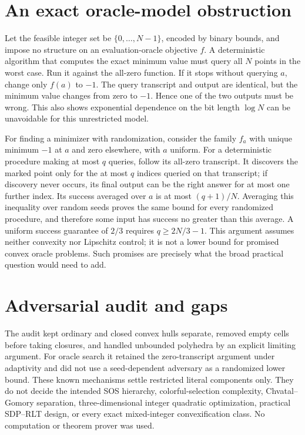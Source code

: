 \documentclass[11pt]{article}
\begin{document}
\section{An exact oracle-model obstruction}
Let the feasible integer set be $\{0,\ldots,N-1\}$, encoded by binary bounds,
and impose no structure on an evaluation-oracle objective $f$.
A deterministic algorithm that computes the exact minimum value must query
all $N$ points in the worst case. Run it against the all-zero function.
If it stops without querying $a$, change only $f(a)$ to $-1$.
The query transcript and output are identical, but the minimum value changes
from zero to $-1$. Hence one of the two outputs must be wrong.
This also shows exponential dependence on the bit length $\log N$ can be
unavoidable for this unrestricted model.

For finding a minimizer with randomization, consider the family $f_a$ with
unique minimum $-1$ at $a$ and zero elsewhere, with $a$ uniform.
For a deterministic procedure making at most $q$ queries, follow its all-zero
transcript. It discovers the marked point only for the at most $q$ indices
queried on that transcript; if discovery never occurs, its final output
can be the right answer for at most one further index. Its success averaged
over $a$ is at most $(q+1)/N$. Averaging this inequality over random seeds
proves the same bound for every randomized procedure, and therefore some
input has success no greater than this average. A uniform success guarantee
of $2/3$ requires $q\ge2N/3-1$.
This argument assumes neither convexity nor Lipschitz control; it is not a
lower bound for promised convex oracle problems. Such promises are precisely
what the broad practical question would need to add.

\section{Adversarial audit and gaps}
The audit kept ordinary and closed convex hulls separate, removed empty cells
before taking closures, and handled unbounded polyhedra by an explicit limiting
argument. For oracle search it retained the zero-transcript argument under
adaptivity and did not use a seed-dependent adversary as a randomized lower
bound. These known mechanisms settle restricted literal components only.
They do not decide the intended SOS hierarchy, colorful-selection complexity,
Chvatal--Gomory separation, three-dimensional integer quadratic optimization,
practical SDP--RLT design, or every exact mixed-integer convexification class.
No computation or theorem prover was used.
\end{document}
